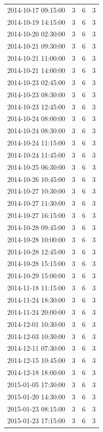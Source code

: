 \begin{tabular}{lrrr}
2014-10-17 09:15:00 & 3 & 6 & 3 \\
2014-10-19 14:15:00 & 3 & 6 & 3 \\
2014-10-20 02:30:00 & 3 & 6 & 3 \\
2014-10-21 09:30:00 & 3 & 6 & 3 \\
2014-10-21 11:00:00 & 3 & 6 & 3 \\
2014-10-21 14:00:00 & 3 & 6 & 3 \\
2014-10-23 02:45:00 & 3 & 6 & 3 \\
2014-10-23 08:30:00 & 3 & 6 & 3 \\
2014-10-23 12:45:00 & 3 & 6 & 3 \\
2014-10-24 08:00:00 & 3 & 6 & 3 \\
2014-10-24 08:30:00 & 3 & 6 & 3 \\
2014-10-24 11:15:00 & 3 & 6 & 3 \\
2014-10-24 11:45:00 & 3 & 6 & 3 \\
2014-10-25 06:30:00 & 3 & 6 & 3 \\
2014-10-26 10:45:00 & 3 & 6 & 3 \\
2014-10-27 10:30:00 & 3 & 6 & 3 \\
2014-10-27 11:30:00 & 3 & 6 & 3 \\
2014-10-27 16:15:00 & 3 & 6 & 3 \\
2014-10-28 09:45:00 & 3 & 6 & 3 \\
2014-10-28 10:00:00 & 3 & 6 & 3 \\
2014-10-28 12:45:00 & 3 & 6 & 3 \\
2014-10-28 15:15:00 & 3 & 6 & 3 \\
2014-10-29 15:00:00 & 3 & 6 & 3 \\
2014-11-18 11:15:00 & 3 & 6 & 3 \\
2014-11-24 18:30:00 & 3 & 6 & 3 \\
2014-11-24 20:00:00 & 3 & 6 & 3 \\
2014-12-01 10:30:00 & 3 & 6 & 3 \\
2014-12-03 10:30:00 & 3 & 6 & 3 \\
2014-12-11 07:30:00 & 3 & 6 & 3 \\
2014-12-15 10:45:00 & 3 & 6 & 3 \\
2014-12-18 18:00:00 & 3 & 6 & 3 \\
2015-01-05 17:30:00 & 3 & 6 & 3 \\
2015-01-20 14:30:00 & 3 & 6 & 3 \\
2015-01-23 08:15:00 & 3 & 6 & 3 \\
2015-01-23 17:15:00 & 3 & 6 & 3 \\

\end{tabular}
